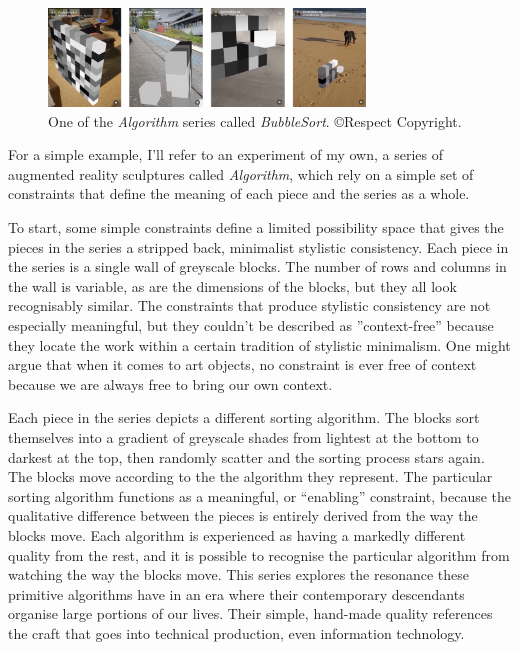 \documentclass[letterpaper]{article}
\begin{document}
    \begin{figure}[h]
    \includegraphics[width=3.31in]{bubble-sort.png}
    \caption{One of the \emph{Algorithm} series called \emph{BubbleSort}. \copyright Respect Copyright.}
    \end{figure}

    For a simple example, I'll refer to an experiment of my own, a series of augmented reality sculptures called \emph{Algorithm}, which rely on a simple set of constraints that define the meaning of each piece and the series as a whole.
    
    To start, some simple constraints define a limited possibility space that gives the pieces in the series a stripped back, minimalist stylistic consistency. Each piece in the series is a single wall of greyscale blocks. The number of rows and columns in the wall is variable, as are the dimensions of the blocks, but they all look recognisably similar. The constraints that produce stylistic consistency are not especially meaningful, but they couldn't be described as ”context-free” because they locate the work within a certain tradition of stylistic minimalism. One might argue that when it comes to art objects, no constraint is ever free of context because we are always free to bring our own context.
    
    Each piece in the series depicts a different sorting algorithm. The blocks sort themselves into a gradient of greyscale shades from lightest at the bottom to darkest at the top, then randomly scatter and the sorting process stars again. The blocks move according to the the algorithm they represent. The particular sorting algorithm functions as a meaningful, or “enabling” constraint, because the qualitative difference between the pieces is entirely derived from the way the blocks move. Each algorithm is experienced as having a markedly different quality from the rest, and it is possible to recognise the particular algorithm from watching the way the blocks move. This series explores the resonance these primitive algorithms have in an era where their contemporary descendants organise large portions of our lives. Their simple, hand-made quality references the craft that goes into technical production, even information technology.
\end{document}
